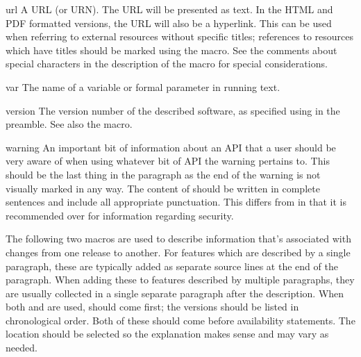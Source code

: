 \documentclass{howto}
\begin{document}
    \begin{macrodesc}{url}{}
      A URL (or URN).  The URL will be presented as text.  In the HTML
      and PDF formatted versions, the URL will also be a hyperlink.
      This can be used when referring to external resources without
      specific titles; references to resources which have titles
      should be marked using the  macro.  See the
      comments about special characters in the description of the
       macro for special considerations.
    \end{macrodesc}

    \begin{macrodesc}{var}{}
      The name of a variable or formal parameter in running text.
    \end{macrodesc}

    \begin{macrodesc}{version}{}
      The version number of the described software, as specified using
       in the preamble.  See also the
       macro.
    \end{macrodesc}

    \begin{macrodesc}{warning}{}
      An important bit of information about an API that a user should
      be very aware of when using whatever bit of API the warning
      pertains to.  This should be the last thing in the paragraph as
      the end of the warning is not visually marked in any way.  The
      content of  should be written in complete sentences
      and include all appropriate punctuation.  This differs from
       in that it is recommended over  for
      information regarding security.
    \end{macrodesc}

    The following two macros are used to describe information that's
    associated with changes from one release to another.  For features
    which are described by a single paragraph, these are typically
    added as separate source lines at the end of the paragraph.  When
    adding these to features described by multiple paragraphs, they
    are usually collected in a single separate paragraph after the
    description.  When both  and
     are used,  should come
    first; the versions should be listed in chronological order.  Both
    of these should come before availability statements.  The location
    should be selected so the explanation makes sense and may vary as
    needed.
\end{document}
